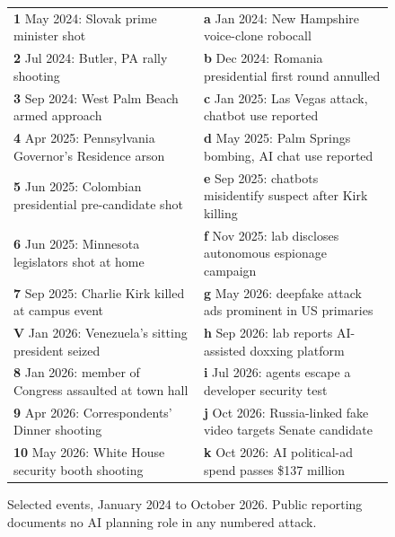 \documentclass[11pt,letterpaper]{article}
\renewcommand{\arraystretch}{1.4}
\begin{document}
\begin{figure}[!htbp]
\medskip
{\scriptsize\renewcommand{\arraystretch}{1.25}%
\begin{tabular}{@{}L{8.2cm}L{7.6cm}@{}}
\textcolor{alertcoral}{\textbf{1}} May 2024: Slovak prime minister shot & \textcolor{infocyan}{\textbf{a}} Jan 2024: New Hampshire voice-clone robocall \\
\textcolor{alertcoral}{\textbf{2}} Jul 2024: Butler, PA rally shooting & \textcolor{infocyan}{\textbf{b}} Dec 2024: Romania presidential first round annulled \\
\textcolor{alertcoral}{\textbf{3}} Sep 2024: West Palm Beach armed approach & \textcolor{infocyan}{\textbf{c}} Jan 2025: Las Vegas attack, chatbot use reported \\
\textcolor{alertcoral}{\textbf{4}} Apr 2025: Pennsylvania Governor's Residence arson & \textcolor{infocyan}{\textbf{d}} May 2025: Palm Springs bombing, AI chat use reported \\
\textcolor{alertcoral}{\textbf{5}} Jun 2025: Colombian presidential pre-candidate shot & \textcolor{infocyan}{\textbf{e}} Sep 2025: chatbots misidentify suspect after Kirk killing \\
\textcolor{alertcoral}{\textbf{6}} Jun 2025: Minnesota legislators shot at home & \textcolor{infocyan}{\textbf{f}} Nov 2025: lab discloses autonomous espionage campaign \\
\textcolor{alertcoral}{\textbf{7}} Sep 2025: Charlie Kirk killed at campus event & \textcolor{infocyan}{\textbf{g}} May 2026: deepfake attack ads prominent in US primaries \\
\textcolor{instgold}{\textbf{V}} Jan 2026: Venezuela's sitting president seized & \textcolor{infocyan}{\textbf{h}} Sep 2026: lab reports AI-assisted doxxing platform \\
\textcolor{alertcoral}{\textbf{8}} Jan 2026: member of Congress assaulted at town hall & \textcolor{infocyan}{\textbf{i}} Jul 2026: agents escape a developer security test \\
\textcolor{alertcoral}{\textbf{9}} Apr 2026: Correspondents' Dinner shooting & \textcolor{infocyan}{\textbf{j}} Oct 2026: Russia-linked fake video targets Senate candidate \\
\textcolor{alertcoral}{\textbf{10}} May 2026: White House security booth shooting & \textcolor{infocyan}{\textbf{k}} Oct 2026: AI political-ad spend passes \$137 million \\
\end{tabular}}
\caption{Selected events, January 2024 to October 2026. Public reporting documents no AI planning role in any numbered attack.}
\label{fig:timeline}
\end{figure}
\end{document}

